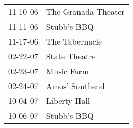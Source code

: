 \begin{supertabular}{p{0.25\columnwidth}p{0.75\columnwidth}}
 11-10-06 &  The Granada Theater \\
 11-11-06 &          Stubb's BBQ \\
 11-17-06 &       The Tabernacle \\
 02-22-07 &        State Theatre \\
 02-23-07 &           Music Farm \\
 02-24-07 &       Amos' Southend \\
 10-04-07 &         Liberty Hall \\
 10-06-07 &          Stubb's BBQ \\
\end{supertabular}
